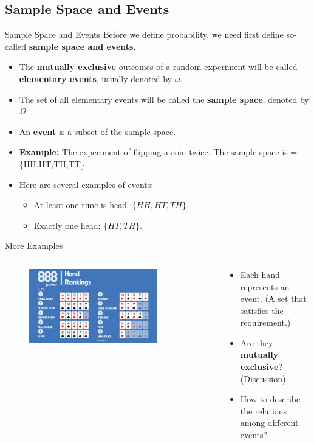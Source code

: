 \subsection{Sample Space and Events}
\begin{frame}{Sample Space and Events}
	Before we define probability, we need first define so-called \textbf{sample space and events.}
	\begin{itemize}
		\item The \textbf{mutually exclusive} outcomes of a random experiment will be called \textbf{elementary events}, usually denoted by $\omega$.
		\pause
		\item  The set of all elementary events will be called the \textbf{sample space}, denoted by $\Omega$. 
		\item An \textbf{event} is a subset of the sample space.\pause
		\item \textbf{Example:} The experiment of flipping a coin twice. The sample space is
		\be
		\Omega=\{HH,HT,TH,TT\}.\nonumber
		\ee
		\item Here are several examples of events:
		\begin{itemize}
			\item At least one time is head :$\{HH,HT,TH\}$.
			\item Exactly one head: $\{HT,TH\}$.
		\end{itemize}
	\end{itemize}
\end{frame}
\begin{frame}{More Examples}
	
	\begin{columns}
		\begin{column}{0.65\textwidth}
				\begin{figure}[HT]
				\includegraphics[width=0.8\textwidth]{poker.jpg}
			\end{figure}
		\end{column}
	\pause
	\begin{column}{0.3\textwidth}
		\begin{itemize}
			\item Each hand represents an event. (A set that satisfies the requirement.)\pause
			\item Are they \textbf{mutually exclusive}? (Discussion)
			\item How to describe the relations among different events? 
		\end{itemize}
	\end{column}
	\end{columns}
\end{frame}

